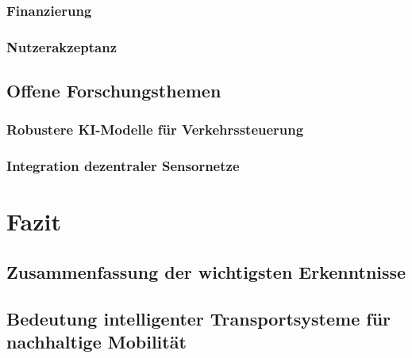 \documentclass[ngerman]{seminarbeitrag} %
\begin{document}
\subsubsection{Finanzierung}
\subsubsection{Nutzerakzeptanz}
\subsection{Offene Forschungsthemen}
\subsubsection{Robustere KI-Modelle für Verkehrssteuerung}
\subsubsection{Integration dezentraler Sensornetze}

\pagebreak
\section{Fazit}
\subsection{Zusammenfassung der wichtigsten Erkenntnisse}
\subsection{Bedeutung intelligenter Transportsysteme für nachhaltige Mobilität}


\end{document}
